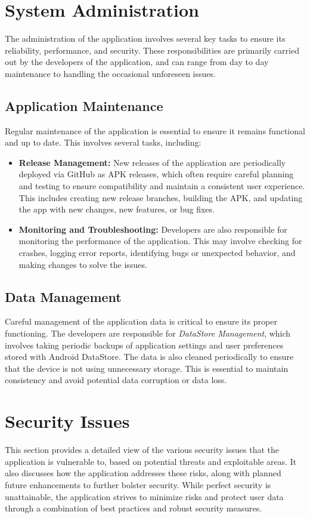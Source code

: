 \section{System Administration}

The administration of the application involves several key tasks to ensure its reliability, performance, and security. These responsibilities are primarily carried out by the developers of the application, and can range from day to day maintenance to handling the occasional unforeseen issues.

\subsection{Application Maintenance}

Regular maintenance of the application is essential to ensure it remains functional and up to date. This involves several tasks, including:

\begin{itemize}
    \item \textbf{Release Management:} New releases of the application are periodically deployed via GitHub as APK releases, which often require careful planning and testing to ensure compatibility and maintain a consistent user experience. This includes creating new release branches, building the APK, and updating the app with new changes, new features, or bug fixes.
    \item \textbf{Monitoring and Troubleshooting:} Developers are also responsible for monitoring the performance of the application. This may involve checking for crashes, logging error reports, identifying bugs or unexpected behavior, and making changes to solve the issues.
\end{itemize}

\subsection{Data Management}

Careful management of the application data is critical to ensure its proper functioning.  The developers are responsible for \textit{DataStore Management}, which involves taking periodic backups of application settings and user preferences stored with Android DataStore. The data is also cleaned periodically to ensure that the device is not using unnecessary storage. This is essential to maintain consistency and avoid potential data corruption or data loss.

\section{Security Issues}
This section provides a detailed view of the various security issues that the application is vulnerable to, based on potential threats and exploitable areas.  It also discusses how the application addresses these risks, along with planned future enhancements to further bolster security.  While perfect security is unattainable, the application strives to minimize risks and protect user data through a combination of best practices and robust security measures.


